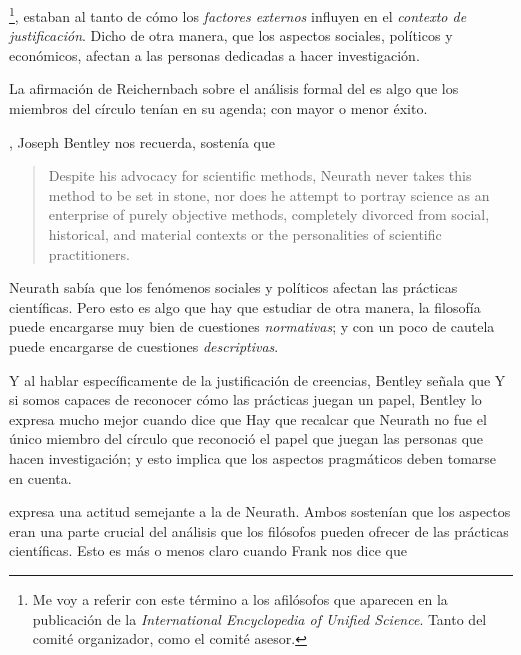 \footnote{
	Me voy a referir con este término a los afilósofos que aparecen en la publicación de la \emph{International Encyclopedia of Unified Science}. Tanto del comité organizador, como el comité asesor.
}, estaban al tanto de cómo los \emph{factores externos} influyen en el \emph{contexto de justificación}.
Dicho de otra manera, que los aspectos sociales, políticos y económicos, afectan a las personas dedicadas a hacer investigación.

La afirmación de Reichernbach sobre el análisis formal del  es algo que los miembros del círculo tenían en su agenda; con mayor o menor éxito.

, Joseph Bentley nos recuerda, sostenía que

\begin{quote}
	Despite his advocacy for scientific methods, Neurath never takes this method to be set in stone, nor does he attempt to portray science as an enterprise of purely objective methods, completely divorced from social, historical, and material contexts  or the personalities of scientific practitioners. \parencite[p.41][]{Bentley2023}
\end{quote}

Neurath sabía que los fenómenos sociales y políticos afectan las prácticas científicas.
Pero esto es algo que hay que estudiar de otra manera, la filosofía puede encargarse muy bien de cuestiones \emph{normativas}; y con un poco de cautela puede encargarse de cuestiones \emph{descriptivas}.

Y al hablar específicamente de la justificación de creencias, Bentley señala que  \parencite[p. 41][]{Bentley2023}
Y si somos capaces de reconocer cómo las prácticas juegan un papel, Bentley lo expresa mucho mejor cuando dice que  \parencite[p. 41][]{Bentley2023}
Hay que recalcar que Neurath no fue el único miembro del círculo que reconoció el papel que juegan las personas que hacen investigación; y esto implica que los aspectos pragmáticos deben tomarse en cuenta.

 expresa una actitud semejante a la de Neurath.
Ambos sostenían que los aspectos  eran una parte crucial del análisis que los filósofos pueden ofrecer de las prácticas científicas.
Esto es más o menos claro cuando Frank nos dice que 

